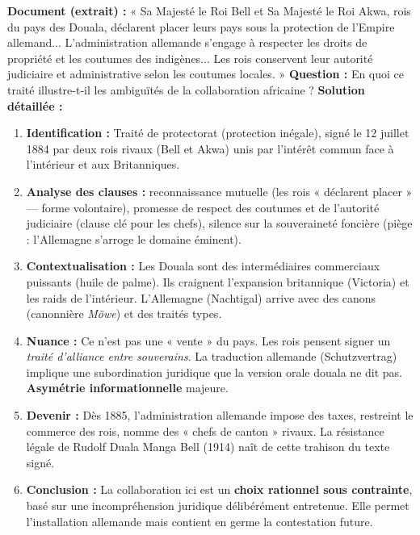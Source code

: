 \documentclass[11pt]{article}
\begin{document}
\begin{exoresolu}
\textbf{Document (extrait) :} « Sa Majesté le Roi Bell et Sa Majesté le Roi Akwa, rois du pays des Douala, déclarent placer leurs pays sous la protection de l'Empire allemand... L'administration allemande s'engage à respecter les droits de propriété et les coutumes des indigènes... Les rois conservent leur autorité judiciaire et administrative selon les coutumes locales. »
\textbf{Question :} En quoi ce traité illustre-t-il les ambiguïtés de la collaboration africaine ?
\textbf{Solution détaillée :}
\begin{enumerate}
    \item \textbf{Identification :} Traité de protectorat (protection inégale), signé le 12 juillet 1884 par deux rois rivaux (Bell et Akwa) unis par l'intérêt commun face à l'intérieur et aux Britanniques.
    \item \textbf{Analyse des clauses :} reconnaissance mutuelle (les rois « déclarent placer » — forme volontaire), promesse de respect des coutumes et de l'autorité judiciaire (clause clé pour les chefs), silence sur la souveraineté foncière (piège : l'Allemagne s'arroge le domaine éminent).
    \item \textbf{Contextualisation :} Les Douala sont des intermédiaires commerciaux puissants (huile de palme). Ils craignent l'expansion britannique (Victoria) et les raids de l'intérieur. L'Allemagne (Nachtigal) arrive avec des canons (canonnière \emph{Möwe}) et des traités types.
    \item \textbf{Nuance :} Ce n'est pas une « vente » du pays. Les rois pensent signer un \emph{traité d'alliance entre souverains}. La traduction allemande (Schutzvertrag) implique une subordination juridique que la version orale douala ne dit pas. \textbf{Asymétrie informationnelle} majeure.
    \item \textbf{Devenir :} Dès 1885, l'administration allemande impose des taxes, restreint le commerce des rois, nomme des « chefs de canton » rivaux. La résistance légale de Rudolf Duala Manga Bell (1914) naît de cette trahison du texte signé.
    \item \textbf{Conclusion :} La collaboration ici est un \textbf{choix rationnel sous contrainte}, basé sur une incompréhension juridique délibérément entretenue. Elle permet l'installation allemande mais contient en germe la contestation future.
\end{enumerate}
\end{exoresolu}
\end{document}
